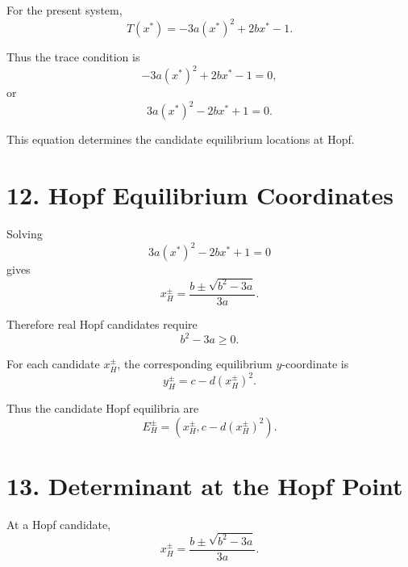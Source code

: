 \documentclass[11pt,a4paper]{article}
\begin{document}
For the present system,
\begin{equation}
T(x^*)
=
-3a(x^*)^2+2bx^*-1.
\end{equation}

Thus the trace condition is
\begin{equation}
-3a(x^*)^2+2bx^*-1=0,
\end{equation}
or
\begin{equation}
\boxed{
3a(x^*)^2-2bx^*+1=0.
}
\tag{41}
\end{equation}

This equation determines the candidate equilibrium locations at Hopf.

\section{12. Hopf Equilibrium Coordinates}

Solving
\begin{equation}
3a(x^*)^2-2bx^*+1=0
\end{equation}
gives
\begin{equation}
\boxed{
x_H^{\pm}
=
\frac{
b\pm\sqrt{b^2-3a}
}{
3a
}.
}
\tag{42}
\end{equation}

Therefore real Hopf candidates require
\begin{equation}
\boxed{
b^2-3a\ge0.
}
\tag{43}
\end{equation}

For each candidate $x_H^\pm$, the corresponding equilibrium
$y$-coordinate is
\begin{equation}
\boxed{
y_H^\pm
=
c-d(x_H^\pm)^2.
}
\tag{44}
\end{equation}

Thus the candidate Hopf equilibria are
\begin{equation}
\boxed{
E_H^\pm
=
\left(
x_H^\pm,
c-d(x_H^\pm)^2
\right).
}
\tag{45}
\end{equation}

\section{13. Determinant at the Hopf Point}

At a Hopf candidate,
\begin{equation}
x_H^\pm
=
\frac{
b\pm\sqrt{b^2-3a}
}{
3a
}.
\end{equation}
\end{document}
